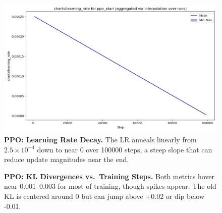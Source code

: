 \begin{figure}[htbp]
	\centering
	\includegraphics[width=.5\textwidth]{figures/ppo/charts_learning_rate_ppo_atari.png}
	\caption{\textbf{PPO: Learning Rate Decay.}
		The LR anneals linearly from $2.5\times10^{-4}$ down to near $0$ 
		over \num{100000} steps, a steep slope that can reduce update magnitudes near the end.}
	\label{fig:ppo_lr}
\end{figure}

\begin{figure}[htbp]
	\centering
	\quad
	\caption{\textbf{PPO: KL Divergences vs.\ Training Steps.}
		Both metrics hover near 0.001--0.003 for most of training, 
		though spikes appear. The old KL is centered around 0 but can jump above +0.02 or dip below -0.01.}
	\label{fig:ppo_bothkl}
\end{figure}

